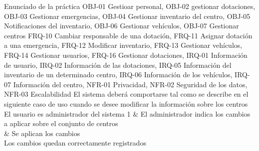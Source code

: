 {\reportauthors}
{Enunciado de la práctica}
{OBJ-01 Gestioar personal, OBJ-02 gestionar dotaciones, OBJ-03 Gestionar emergencias, OBJ-04 Gestionar inventario del centro, OBJ-05 Notificaciones del inventario, OBJ-06 Gestionar vehículos, OBJ-07 Gestionar centros}
{FRQ-10 Cambiar responsable de una dotación, FRQ-11 Asignar dotación a una emergencia, FRQ-12 Modificar inventario, FRQ-13 Gestionar vehículos, FRQ-14 Gestionar usuarios, FRQ-16 Gestionar dotaciones, IRQ-01 Información de usuario, IRQ-02 Información de las dotaciones, IRQ-05 Información del inventario de un determinado centro, IRQ-06 Información de los vehículos, IRQ-07 Información del centro, NFR-01 Privacidad, NFR-02 Seguridad de los datos, NFR-03 Escalabilidad}
{El sistema deberá comportarse tal como se describe en el siguiente caso de uso cuando se desee modificar la información sobre los centros}
{El usuario es administrador del sistema}
{
1 & El administrador indica los cambios a aplicar sobre el conjunto de centros \\  & Se aplican los cambios \\
}
{Los cambios quedan correctamente registrados}
{}

